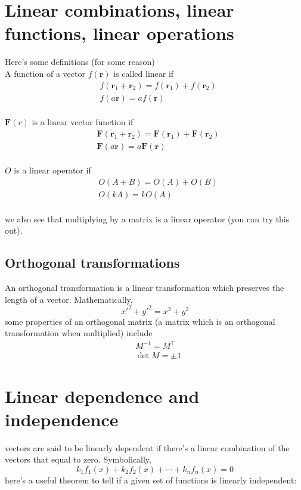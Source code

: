 \documentclass[oneside]{book}
\numberwithin{equation}{chapter} %
\begin{document}
\section{Linear combinations, linear functions, linear operations}
Here's some definitions (for some reason)\\

A function of a vector $f(\mathbf r)$ is called linear if 
\begin{align*}
	&f(\mathbf{r}_1+\mathbf{r}_2)=f(\mathbf r_1)+f(\mathbf r_2)\\
	&f(a\mathbf r)=af(\mathbf r)
\end{align*}\\

$\mathbf F(r)$ is a linear vector function if
\begin{align*}
	&\mathbf F(\mathbf r_1+\mathbf r_2)=\mathbf F(\mathbf r_1)+\mathbf F(\mathbf r_2)\\
	&\mathbf F(a\mathbf r)=a\mathbf F(\mathbf r)
\end{align*}\\

$O$ is a linear operator if 
\begin{align*}
	&O(A+B)=O(A)+O(B)\\
	&O(kA)=kO(A)
\end{align*}\\

we also see that multiplying by a matrix is a linear operator (you can try this out). 
\subsection{Orthogonal transformations}
An orthogonal transformation is a linear transformation which preserves the length of a vector. Mathematically,
$$x'^2+y'^2=x^2+y^2$$
some properties of an orthogonal matrix (a matrix which is an orthogonal transformation when multiplied) include
\begin{align*}
	&M^{-1}=M^\intercal\\
	&\det M=\pm 1
\end{align*}
\section{Linear dependence and independence}
vectors are said to be linearly dependent if there's a linear combination of the vectors that equal to zero. Symbolically,
$$k_1f_1(x)+k_2f_2(x)+\cdots +k_nf_n(x)=0$$
here's a useful theorem to tell if a given set of functions is linearly independent:\\
\end{document}
